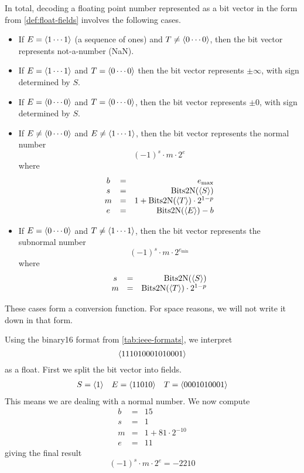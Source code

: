 In total, decoding a floating point number represented as a bit vector
in the form from \cref{def:float-fields} involves the following cases.

\begin{itemize}
\item If $E = \langle 1\cdots{} 1 \rangle$ (a sequence of ones) and
  $T \neq \langle 0\cdots{} 0 \rangle$, then the bit vector represents
  not-a-number (NaN).
\item If $E = \langle 1\cdots{} 1 \rangle$ and
  $T = \langle 0\cdots{} 0 \rangle$ then the bit vector represents
  $\pm\infty$, with sign determined by $S$.
\item If $E = \langle 0\cdots{} 0 \rangle$ and
  $T = \langle 0\cdots{} 0 \rangle$, then the bit vector represents
  $\pm 0$, with sign determined by $S$.
\item If $E \neq \langle 0\cdots{} 0 \rangle$ and
  $E \neq \langle 1\cdots{} 1 \rangle$, then the bit vector represents the
  normal number
  \[
    (-1)^{s} \cdot m \cdot 2^e
  \]
  where
  \[
    \begin{array}{ccr}
      b &=& e_{\text{max}} \\
      s &=& \mathrm{Bits2N}(\langle S \rangle) \\
      m &=& 1+\mathrm{Bits2N}(\langle T \rangle) \cdot{} 2^{1-p} \\
      e &=& \mathrm{Bits2N}(\langle E \rangle) - b
    \end{array}
  \]
\item If $E = \langle 0\cdots{} 0 \rangle$ and
  $T \neq \langle 1\cdots{} 1 \rangle$, then the bit vector represents the
  subnormal number
  \[
    (-1)^{s} \cdot m \cdot 2^{e_{\text{min}}}
  \]
  where
  \[
    \begin{array}{ccr}
      s &=& \mathrm{Bits2N}(\langle S \rangle) \\
      m &=& \mathrm{Bits2N}(\langle T \rangle) \cdot{} 2^{1-p} \\
    \end{array}
  \]
\end{itemize}

These cases form a conversion function.  For space reasons, we will
not write it down in that form.

\begin{example}
  Using the binary16 format from \cref{tab:ieee-formats}, we interpret
  \[
    \langle 111010001010001 \rangle
  \]
  as a float.  First we split the bit vector into fields.
  \[
    \begin{array}{lll}
      S=\langle 1 \rangle & E=\langle 11010 \rangle & T=\langle 0001010001 \rangle
    \end{array}
  \]
  This means we are dealing with a normal number.  We now compute
  \[
    \begin{array}{ccr}
      b &=& 15 \\
      s &=& 1 \\
      m &=& 1 + 81 \cdot 2^{-10} \\
      e &=& 11
    \end{array}
  \]
  giving the final result
  \[
    (-1)^{s} \cdot m \cdot 2^{e} = -2210
  \]
\end{example}

